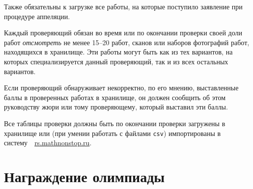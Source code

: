 \documentclass[a4paper,12pt]{article}
\begin{document}
Также обязательны к загрузке все работы, на которые поступило заявление при процедуре аппеляции.

Каждый проверяющий обязан во время или по окончании проверки своей доли работ {\it отсмотреть} не менее 15–20 работ, сканов или наборов фотографий работ, находящихся в хранилище. Эти работы могут быть как из тех вариантов, на которых специализируется данный проверяющий, так и из всех остальных вариантов.

Если проверяющий обнаруживает некорректно, по его мнению, выставленные баллы в проверенных работах в хранилище, он должен сообщить об этом руководству жюри или тому проверяющему, который выставил эти баллы.

Все таблицы проверки должны быть по окончании проверки загружены в хранилище или (при умении работать с файлами {\tt csv}) импортированы в систему\ \ \url{rs.mathnonstop.ru}.

\section{Награждение олимпиады}
\end{document}
